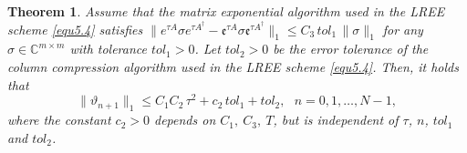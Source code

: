 \documentclass[preprint,3p,compress,12pt]{elsarticle}
\numberwithin{equation}{section}
\newtheorem{theorem}{Theorem}[section]
\numberwithin{figure}{section}
\begin{document}
\begin{theorem}\label{thm5.0}
Assume that the matrix exponential algorithm used in the LREE scheme \eqref{equ5.4} satisfies
 $\|e^{\tau A}\sigma e^{\tau A^{\dag}}-\mathfrak{e}^{\tau A}\sigma\mathfrak{e}^{\tau A^{\dag}}\|_1\leq C_3 \, tol_1\, \|\sigma\|_1$ for any $\sigma\in \mathbb{C}^{m\times m}$ with tolerance $tol_1>0$. Let $tol_2>0$ be the error tolerance of the column compression algorithm used in the LREE scheme \eqref{equ5.4}.
  Then, it holds that
  \begin{equation}\label{equ5.7}
  \|\vartheta_{n+1}\|_1\leq C_1C_2 \, \tau^2+c_2\, tol_1+tol_2,~~~n=0,1,\ldots,N-1,
\end{equation}
where the constant $c_2>0$ depends on $C_1,~C_3,~T$, but is independent of $\tau$, $n$, $tol_1$ and $tol_2$.
\end{theorem}
\end{document}

